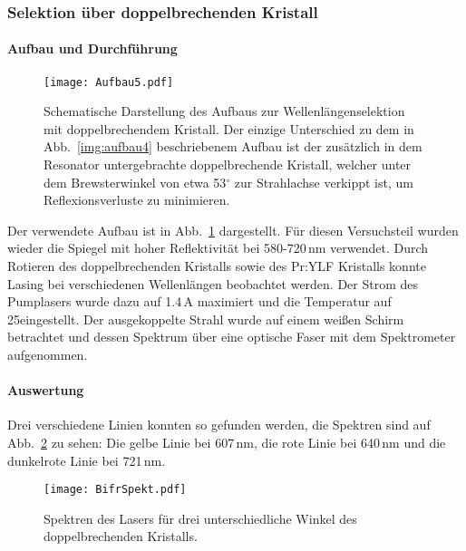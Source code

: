 \subsubsection{Selektion über doppelbrechenden Kristall}


\paragraph{Aufbau und Durchführung}


\begin{figure}[H]
\begin{center}
  \texttt{[image: Aufbau5.pdf]}
  \caption{Schematische Darstellung des Aufbaus zur Wellenlängenselektion mit doppelbrechendem Kristall.
   Der einzige Unterschied zu dem in Abb.~\ref{img:aufbau4} beschriebenem Aufbau ist der zusätzlich
  in dem Resonator untergebrachte doppelbrechende Kristall, welcher unter dem Brewsterwinkel von
  etwa 53$^\circ$ zur Strahlachse verkippt ist, um Reflexionsverluste zu minimieren.}
  \label{img:aufbau5}
\end{center}
\end{figure}

Der verwendete Aufbau ist in Abb.~\ref{img:aufbau5} dargestellt.
Für diesen Versuchsteil wurden wieder die Spiegel mit hoher Reflektivität bei 580-720\,nm verwendet.
Durch Rotieren des doppelbrechenden Kristalls sowie des Pr:YLF Kristalls konnte Lasing bei
verschiedenen Wellenlängen beobachtet werden. Der Strom des Pumplasers wurde dazu auf 1.4\,A
maximiert und die Temperatur auf 25\grad eingestellt. Der ausgekoppelte Strahl wurde auf einem
weißen Schirm betrachtet und dessen Spektrum über eine optische Faser mit dem Spektrometer
aufgenommen.



\paragraph{Auswertung}
Drei verschiedene Linien konnten so gefunden werden,
die Spektren sind auf Abb.~\ref{img:BifrSpekt} zu sehen:
Die gelbe Linie bei 607\,nm, die rote Linie bei 640\,nm und die dunkelrote Linie bei 721\,nm.



\begin{figure}[H]
\begin{center}
  \texttt{[image: BifrSpekt.pdf]}
  \caption{Spektren des Lasers für drei unterschiedliche Winkel des doppelbrechenden Kristalls.}
  \label{img:BifrSpekt}
\end{center}
\end{figure}

